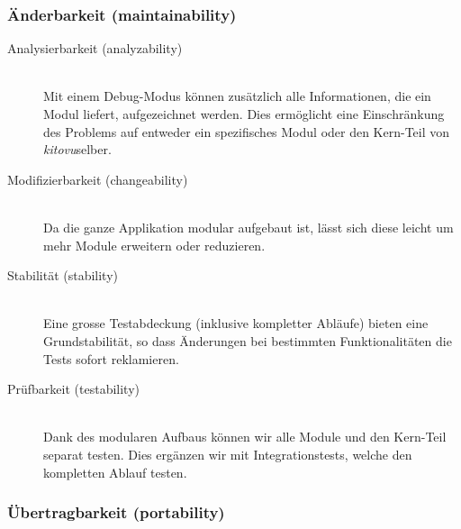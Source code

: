 \documentclass[a4paper]{article}
\begin{document}
\subsubsection{Änderbarkeit (maintainability)}

\begin{description}
  \item[Analysierbarkeit (analyzability)] \strut \\
    Mit einem Debug-Modus können zusätzlich alle Informationen, die ein Modul liefert, aufgezeichnet werden.
    Dies ermöglicht eine Einschränkung des Problems auf entweder ein spezifisches Modul oder den Kern-Teil von \emph{kitovu}selber.
  \item[Modifizierbarkeit (changeability)] \strut \\
    Da die ganze Applikation modular aufgebaut ist, lässt sich diese leicht um mehr Module erweitern oder reduzieren.
  \item[Stabilität (stability)] \strut \\
    Eine grosse Testabdeckung (inklusive kompletter Abläufe) bieten eine Grundstabilität, so dass Änderungen bei bestimmten Funktionalitäten die Tests sofort reklamieren.
  \item[Prüfbarkeit (testability)] \strut \\
    Dank des modularen Aufbaus können wir alle Module und den Kern-Teil separat testen.
    Dies ergänzen wir mit Integrationstests, welche den kompletten Ablauf testen.
\end{description}

\subsubsection{Übertragbarkeit (portability)}
\end{document}
